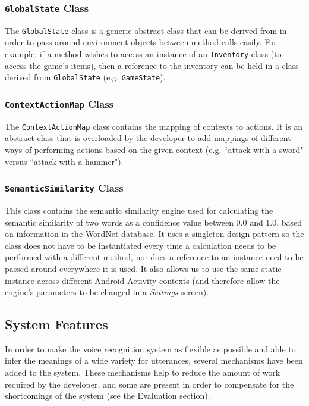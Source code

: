 \documentclass[11pt]{article}
\begin{document}
\subsubsection{\texttt{GlobalState} Class}

The \texttt{GlobalState} class is a generic abstract class that can be derived from in order to pass around environment objects between method calls easily. For example, if a method wishes to access an instance of an \texttt{Inventory} class (to access the game's items), then a reference to the inventory can be held in a class derived from \texttt{GlobalState} (e.g. \texttt{GameState}).

\subsubsection{\texttt{ContextActionMap} Class}

The \texttt{ContextActionMap} class contains the mapping of contexts to actions. It is an abstract class that is overloaded by the developer to add mappings of different ways of performing actions based on the given context (e.g. ``attack with a sword" versus ``attack with a hammer").

\subsubsection{\texttt{SemanticSimilarity} Class}

This class contains the semantic similarity engine used for calculating the semantic similarity of two words as a confidence value between 0.0 and 1.0, based on information in the WordNet database. It uses a singleton design pattern so the class does not have to be instantiated every time a calculation needs to be performed with a different method, nor does a reference to an instance need to be passed around everywhere it is used. It also allows us to use the same static instance across different Android Activity contexts (and therefore allow the engine's parameters to be changed in a \textit{Settings} screen).

\subsection{System Features}

In order to make the voice recognition system as flexible as possible and able to infer the meanings of a wide variety for utterances, several mechanisms have been added to the system. These mechanisms help to reduce the amount of work required by the developer, and some are present in order to compensate for the shortcomings of the system (see the Evaluation section).
\end{document}

